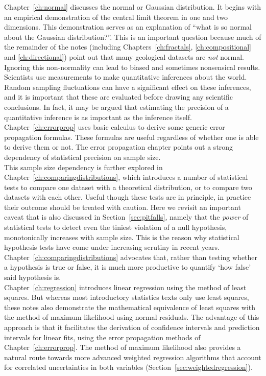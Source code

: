 Chapter~\ref{ch:normal} discusses the normal or Gaussian
distribution. It begins with an empirical demonstration of the central
limit theorem in one and two dimensions. This demonstration serves as
an explanation of ``what is so normal about the Gaussian
distribution?''.  This is an important question because much of the
remainder of the notes (including Chapters~\ref{ch:fractals},
\ref{ch:compositional} and \ref{ch:directional}) point out that many
geological datasets are \emph{not} normal. Ignoring this non-normality
can lead to biased and sometimes nonsensical results.\\

Scientists use measurements to make quantitative inferences about the
world.  Random sampling fluctuations can have a significant effect on
these inferences, and it is important that these are evaluated before
drawing any scientific conclusions. In fact, it may be argued that
estimating the precision of a quantitative inference is as important
as the inference itself.  Chapter~\ref{ch:errorprop} uses basic
calculus to derive some generic error propagation formulas.  These
formulas are useful regardless of whether one is able to derive them
or not.  The error propagation chapter points out a strong dependency
of statistical precision on sample size.\\

This sample size dependency is further explored in
Chapter~\ref{ch:comparingdistributions}, which introduces a number of
statistical tests to compare one dataset with a theoretical
distribution, or to compare two datasets with each other. Useful
though these tests are in principle, in practice their outcome should
be treated with caution. Here we revisit an important caveat that is
also discussed in Section~\ref{sec:pitfalls}, namely that the
\emph{power} of statistical tests to detect even the tiniest violation
of a null hypothesis, monotonically increases with sample size. This
is the reason why statistical hypothesis tests have come under
increasing scrutiny in recent years.
Chapter~\ref{ch:comparingdistributions} advocates that, rather than
testing whether a hypothesis is true or false, it is much more
productive to quantify `how false' said hypothesis is.\\

Chapter~\ref{ch:regression} introduces linear regression using the
method of least squares. But whereas most introductory statistics
texts only use least squares, these notes also demonstrate the
mathematical equivalence of least squares with the method of maximum
likelihood using normal residuals. The advantage of this approach is
that it facilitates the derivation of confidence intervals and
prediction intervals for linear fits, using the error propagation
methods of Chapter~\ref{ch:errorprop}. The method of maximum
likelihood also provides a natural route towards more advanced
weighted regression algorithms that account for correlated
uncertainties in both variables
(Section~\ref{sec:weightedregression}).\\

